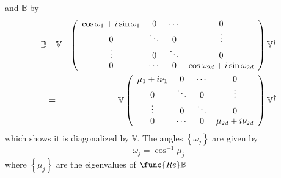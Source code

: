 \documentclass[aps,preprint]{revtex4}
\begin{document}
and $\mathbb{B}$ by 
\begin{eqnarray}
\mathbb{B} &\mathbb{=V}&\left( 
\begin{array}{cccc}
\cos \omega _{1}+i\sin \omega _{1} & 0 & \cdots & 0 \\ 
0 & \ddots & 0 & \vdots \\ 
\vdots & 0 & \ddots & 0 \\ 
0 & \cdots & 0 & \cos \omega _{2d}+i\sin \omega _{2d}%
\end{array}%
\right) \mathbb{V}^{\dagger }  \notag \\
&=&\mathbb{V}\left( 
\begin{array}{cccc}
\mu _{1}+i\nu _{1} & 0 & \cdots & 0 \\ 
0 & \ddots & 0 & \vdots \\ 
\vdots & 0 & \ddots & 0 \\ 
0 & \cdots & 0 & \mu _{2d}+i\nu _{2d}%
\end{array}%
\right) \mathbb{V}^{\dagger }
\end{eqnarray}%
which shows it is diagonalized by $\mathbb{V}$. The angles $\left\{ \omega
_{j}\right\} $ are given by 
\begin{equation}
\omega _{j}=\cos ^{-1}\mu _{j}
\end{equation}%
where $\left\{ \mu _{j}\right\} $ are the eigenvalues of $\func{Re}\mathbb{B}
$
\end{document}
